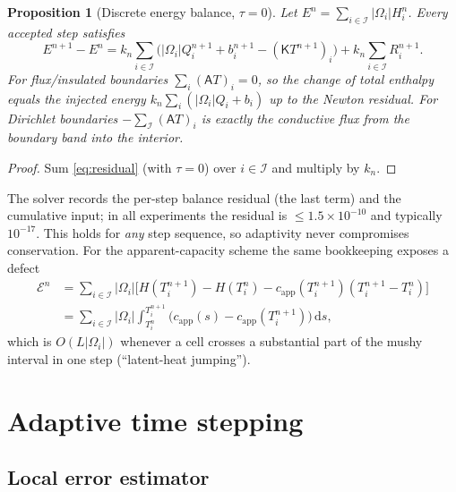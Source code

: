\documentclass[11pt]{article}
\numberwithin{equation}{section}
\newtheorem{proposition}{Proposition}[section]
\theoremstyle{remark}
\newcommand{\dd}{\,\mathrm{d}}
\newcommand{\K}{\mathsf{K}}
\newcommand{\capp}{c_{\mathrm{app}}}
\begin{document}
\begin{proposition}[Discrete energy balance, $\tau=0$]
Let $E^n=\sum_{i\in\mathcal I}|\Omega_i|H_i^n$.  Every accepted step satisfies
\begin{equation}
  E^{n+1}-E^n = k_n\sum_{i\in\mathcal I}\Big(|\Omega_i|Q_i^{n+1}+b_i^{n+1}-(\K T^{n+1})_i\Big)
  + k_n\sum_{i\in\mathcal I}R_i^{n+1}.
  \label{eq:energy}
\end{equation}
For flux/insulated boundaries $\sum_i(\mathsf A T)_i=0$, so the change of total
enthalpy equals the injected energy $k_n\sum_i(|\Omega_i|Q_i+b_i)$ up to the
Newton residual.  For Dirichlet boundaries $-\sum_{\mathcal I}(\mathsf AT)_i$ is
exactly the conductive flux from the boundary band into the interior.
\end{proposition}
\begin{proof}
Sum \eqref{eq:residual} (with $\tau=0$) over $i\in\mathcal I$ and multiply by $k_n$.
\end{proof}
The solver records the per-step balance residual (the last term) and the
cumulative input; in all experiments the residual is $\le1.5\times10^{-10}$ and
typically $10^{-17}$.  This holds for \emph{any} step sequence, so adaptivity
never compromises conservation.  For the apparent-capacity scheme the same
bookkeeping exposes a defect
\begin{equation}
\begin{aligned}
  \mathcal E^n &= \sum_{i\in\mathcal I}|\Omega_i|\Big[H(T_i^{n+1})-H(T_i^n)-\capp(T_i^{n+1})(T_i^{n+1}-T_i^n)\Big]\\
  &= \sum_{i\in\mathcal I}|\Omega_i|\int_{T_i^n}^{T_i^{n+1}}\!\!\big(\capp(s)-\capp(T_i^{n+1})\big)\dd s,
\end{aligned}
  \label{eq:defect}
\end{equation}
which is $O(L|\Omega_i|)$ whenever a cell crosses a substantial part of the mushy
interval in one step (``latent-heat jumping'').

\section{Adaptive time stepping}
\label{sec:adaptive}

\subsection{Local error estimator}
\end{document}
